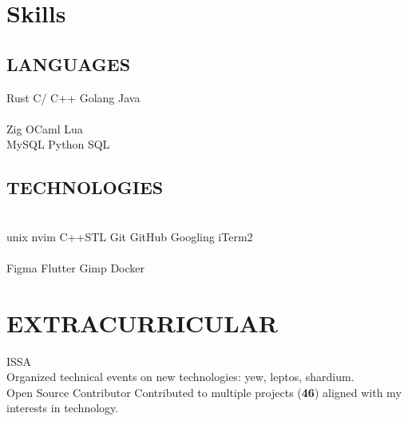 \documentclass[]{deedy-resume-openfont}
\begin{document}
\begin{minipage}[t]{0.33\textwidth}




\section{Skills}
\subsection{LANGUAGES}
Rust \textbullet{} C/ C++ \textbullet{} Golang \textbullet{} Java  \\
 \\ 

 Zig \textbullet{} OCaml  \textbullet{} Lua\\
MySQL \textbullet{} Python   \textbullet{} SQL\\ 
\sectionsep
\subsection{TECHNOLOGIES}
\\
unix \textbullet{} nvim \textbullet{} C++STL \textbullet{} Git \textbullet{} GitHub  \textbullet{} Googling  \textbullet{} iTerm2\\
\\
Figma \textbullet{} Flutter \textbullet{} Gimp \textbullet{} Docker \\

\section{EXTRACURRICULAR}
ISSA  \\
Organized technical events on new technologies: yew, leptos, shardium.\\
\sectionsep
Open Source Contributor 
Contributed to multiple projects (\textbf{46}) aligned with my interests in technology.

%
%

\end{minipage} 
\end{document}
